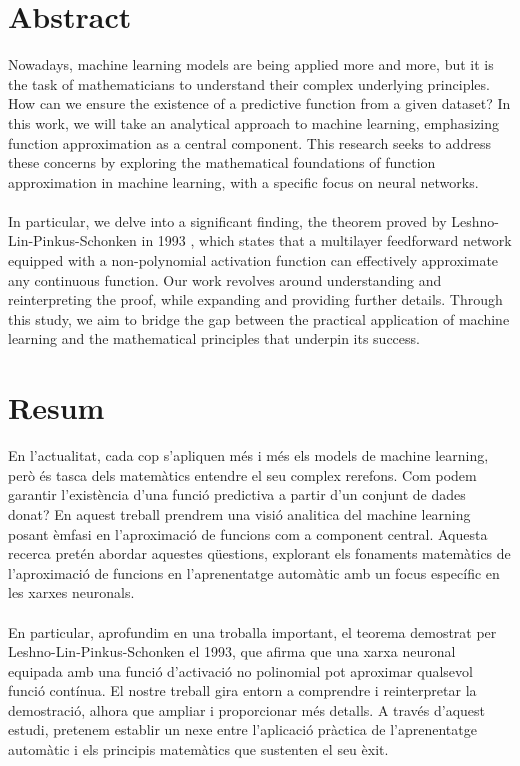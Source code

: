 \documentclass[../../main.tex]{subfiles}
\begin{document}
\section*{Abstract} %


\noindent Nowadays, machine learning models are being applied more and more, but it is the task of mathematicians to understand their complex underlying principles. How can we ensure the existence of a predictive function from a given dataset? In this work, we will take an analytical approach to machine learning, emphasizing function approximation as a central component. This research seeks to address these concerns by exploring the mathematical foundations of function approximation in machine learning, with a specific focus on neural networks.
\\ \\
In particular, we delve into a significant finding, the theorem proved by Leshno-Lin-Pinkus-Schonken in 1993 \cite{leshno1993multilayer}, which states that a multilayer feedforward network equipped with a non-polynomial activation function can effectively approximate any continuous function. Our work revolves around understanding and reinterpreting the proof, while expanding and providing further details.
Through this study, we aim to bridge the gap between the practical application of machine learning and the mathematical principles that underpin its success.

\newpage

\section*{Resum}
\noindent En l'actualitat, cada cop s'apliquen més i més els models de machine learning, però és tasca dels matemàtics entendre el seu complex rerefons. Com podem garantir l'existència d'una funció predictiva a partir d'un conjunt de dades donat?  En aquest treball prendrem una visió analitica del machine learning posant èmfasi en l'aproximació de funcions com a component central. Aquesta recerca pretén abordar aquestes qüestions, explorant els fonaments matemàtics de l'aproximació de funcions en l'aprenentatge automàtic amb un focus específic en les xarxes neuronals.
\\ \\
\noindent En particular, aprofundim en una troballa important, el teorema demostrat per Leshno-Lin-Pinkus-Schonken el 1993, que afirma que una xarxa neuronal equipada amb una funció d'activació no polinomial pot aproximar qualsevol funció contínua. El nostre treball gira entorn a comprendre i reinterpretar la demostració, alhora que ampliar i proporcionar més detalls.
A través d'aquest estudi, pretenem establir un nexe entre l'aplicació pràctica de l'aprenentatge automàtic i els principis matemàtics que sustenten el seu èxit.
\end{document}
